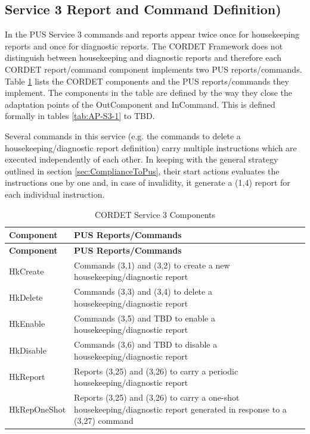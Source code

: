 \documentclass[a4paper,10pt]{article}
\begin{document}
\subsection{Service 3 Report and Command Definition)}\label{sec:serv3RepCmdDef}
In the PUS Service 3 commands and reports appear twice once for housekeeping reports and once for diagnostic reports. The CORDET Framework does not distinguish between housekeeping and diagnostic reports and therefore each CORDET report/command component implements two PUS reports/commands. Table \ref{tab:serv3Components} lists the CORDET components and the PUS reports/commands they implement. The components in the table are defined by the way they close the adaptation points of the OutComponent and InCommand. This is defined formally in tables \ref{tab:AP-S3-1} to TBD. 

Several commands in this service (e.g. the commands to delete a housekeeping/diagnostic report definition) carry multiple instructions which are executed independently of each other. In keeping with the general strategy outlined in section \ref{sec:ComplianceToPus}, their start actions evaluates the instructions one by one and, in case of invalidity, it generate a (1,4) report for each individual instruction.

\begin{longtable}{|l|p{10cm}|}
\caption{CORDET Service 3 Components}\label{tab:serv3Components} \\
\hline
\rowcolor{light-gray}
\textbf{Component} & \textbf{PUS Reports/Commands} \\
\hline\hline
\endfirsthead
\rowcolor{light-gray}
\textbf{Component} & \textbf{PUS Reports/Commands} \\
\hline\hline
\endhead
HkCreate & Commands (3,1) and (3,2) to create a new housekeeping/diagnostic report  \\
\hline
HkDelete & Commands (3,3) and (3,4) to delete a housekeeping/diagnostic report  \\
\hline
HkEnable & Commands (3,5) and TBD to enable a housekeeping/diagnostic report  \\
\hline
HkDisable & Commands (3,6) and TBD to disable a housekeeping/diagnostic report  \\
\hline

HkReport & Reports (3,25) and (3,26) to carry a periodic housekeeping/diagnostic report  \\
\hline
HkRepOneShot & Reports (3,25) and (3,26) to carry a one-shot housekeeping/diagnostic report generated in response to a (3,27) command \\
\hline



\end{longtable}  
\end{document}
